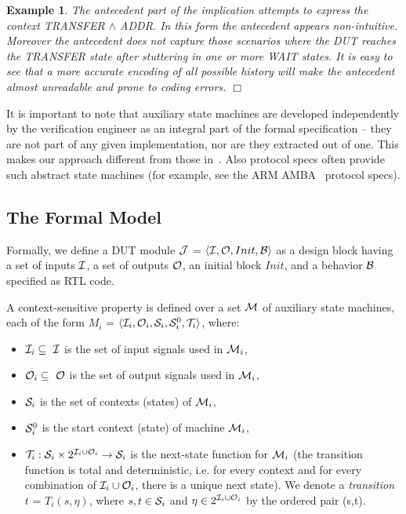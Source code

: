 \documentclass[a4paper, 11pt]{article}
\newtheorem{example}{Example} %
\begin{document}
\begin{example}
{\noindent
The antecedent part of the implication attempts to express the context
TRANSFER $\land$ ADDR. In this form the antecedent appears non-intuitive.
Moreover the antecedent does not capture those scenarios where the DUT
reaches the TRANSFER state after stuttering in one or more WAIT states.
It is easy to see that a more accurate encoding of all possible history
will make the antecedent almost unreadable and prone to coding errors.
} $\Box$
\end{example}

\noindent
It is important to note that auxiliary state machines are developed
independently by the verification engineer as an integral part of the
formal specification -- they are not part of any given implementation,
nor are they extracted out of one. This makes our approach different from 
those in~\cite{kunz, guido}. Also protocol specs often provide
such abstract state machines (for example, see the ARM AMBA~\cite{ahb} 
protocol specs).

\subsection{The Formal Model} \label{sec5.1}
\noindent
Formally, we define a DUT module ${\cal J}$ =
$\langle {\cal I}, {\cal O}, Init, {\cal B} \rangle$ as a design block having
a set of inputs ${\cal I}$, a set of outputs ${\cal O}$, an initial block
$Init$, and a behavior ${\cal B}$ specified as RTL code.

A context-sensitive property is defined over a set ${\cal M}$ of auxiliary
state machines, each of the form $M_i$ =
$\langle {\cal I}_i, {\cal O}_i, {\cal S}_i, {\cal S}^0_i, {\cal T}_i \rangle$, where:
\begin{itemize}
\item ${\cal I}_i \subseteq\ {\cal I}$ is the set of input
    signals used in ${\cal M}_i$,
\item ${\cal O}_i \subseteq\ {\cal O}$ is the set of output
    signals used in ${\cal M}_i$,
\item ${\cal S}_i$ is the set of contexts (states) of ${\cal M}_i$,
\item ${\cal S}^0_i$ is the start context (state) of machine ${\cal M}_i$,
\item ${\cal T}_i: {\cal S}_i \times 2^{{\cal I}_i \cup {\cal O}_i}
    \rightarrow {\cal S}_i$
    is the next-state function for ${\cal M}_i$ (the transition function
    is total and deterministic,
    i.e. for every context and for every combination of
    ${\cal I}_i \cup {\cal O}_i$, there is a unique next state). We
    denote a {\em transition}
    $t$ = $T_i(s, \eta)$, where $s,t \in {\cal S}_i$ and $\eta \in
    2^{{\cal I}_i \cup   {\cal O}_i}$ by the ordered pair (s,t).
\end{itemize}
\end{document}
